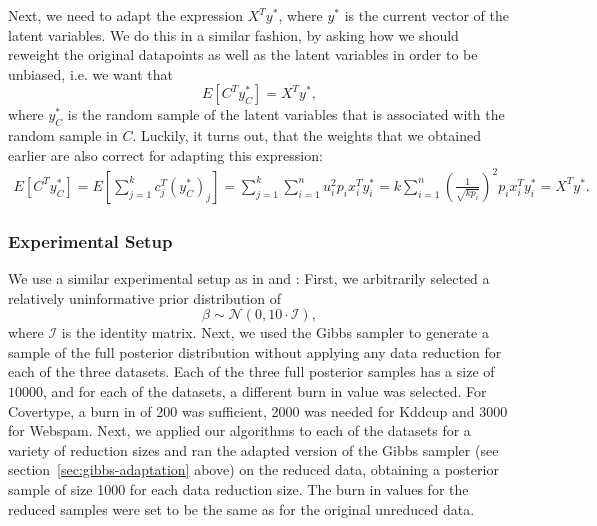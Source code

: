 Next, we need to adapt the expression
$X^Ty^\ast$, where $y^\ast$ is the current vector of the latent
variables. We do this in a similar fashion, by asking
how we should reweight the original datapoints as well as the
latent variables in order to be unbiased, i.e. we want that
\begin{equation*}
    E\left[ C^T y_C^\ast \right] = X^T y^\ast,
\end{equation*}
where $y_C^\ast$ is the random sample of the latent variables that
is associated with the random sample in $C$.
Luckily, it turns out, that the weights that we obtained earlier
are also correct for adapting this expression:
\begin{align*}
    E\left[ C^T y_C^\ast \right] = E\left[ \sum_{j=1}^k c_j^T (y_C^\ast)_j \right]
    = \sum_{j=1}^k \sum_{i=1}^n u_i^2 p_i x_i^T y^\ast_i
    = k \sum_{i=1}^n \left(\frac{1}{\sqrt{kp_i}}\right)^2 p_i x_i^T y^\ast_i
    = X^T y^\ast.
\end{align*}

\subsubsection{Experimental Setup}

We use a similar experimental setup
as in \cite{scalable-bayesian-logreg} and
\cite{bayesian-regression}:
First, we arbitrarily selected a relatively uninformative
prior distribution of
\begin{equation*}
    \beta \sim \mathcal{N}(0, 10 \cdot \mathcal{I}),
\end{equation*}
where $\mathcal{I}$ is the identity matrix.
Next, we used the Gibbs sampler
to generate a sample of the full posterior
distribution without applying any data reduction for each
of the three datasets.
Each of the three full posterior samples has a size of $10000$,
and for each of the datasets, a different
burn in value was selected. For Covertype, a burn in
of 200 was sufficient, 2000 was needed for Kddcup and 3000
for Webspam.
Next, we applied our algorithms to each of the datasets
for a variety of reduction sizes and ran the adapted version of
the Gibbs sampler (see section~\ref{sec:gibbs-adaptation} above)
on the reduced data, obtaining a posterior sample of size 1000
for each data reduction size. The burn in values for
the reduced samples were set to be
the same as for the original unreduced data.


